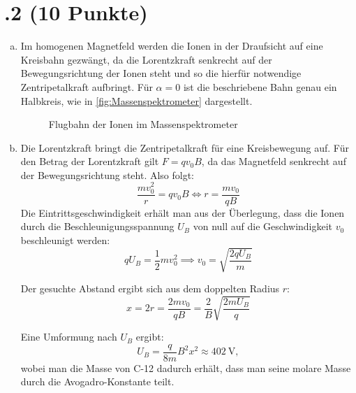 \section*{\nr.2 \tittwo (10 Punkte)}
\begin{enumerate}[(a)]
\item 
Im homogenen Magnetfeld werden die Ionen in der Draufsicht auf eine Kreisbahn gezwängt, da die Lorentzkraft senkrecht auf der Bewegungsrichtung der Ionen steht und so die hierfür notwendige Zentripetalkraft aufbringt. Für $\alpha=0$ ist die beschriebene Bahn genau ein Halbkreis, wie in \vref{fig:Massenspektrometer} dargestellt.
\begin{figure}[htbp]
\centering
{}
\caption{Flugbahn der Ionen im Massenspektrometer}
\label{fig:Massenspektrometer}
\end{figure}

\item Die Lorentzkraft bringt die Zentripetalkraft für eine Kreisbewegung auf. Für den Betrag der Lorentzkraft gilt $F=qv_0B$, da das Magnetfeld senkrecht auf der Bewegungsrichtung steht. Also folgt:
\begin{equation}
\frac{mv_0^2}{r} = q v_0 B \iff r = \frac{mv_0}{qB}
\end{equation}
Die Eintrittsgeschwindigkeit erhält man aus der Überlegung, dass die Ionen durch die Beschleunigungsspannung $U_B$ von null auf die Geschwindigkeit $v_0$ beschleunigt werden:
\begin{equation}
qU_B = \frac{1}{2} m v_0^2 \implies v_0 = \sqrt{\frac{2qU_B}{m}}
\end{equation}

Der gesuchte Abstand ergibt sich aus dem doppelten Radius $r$:
\begin{equation}
x=2r = \frac{2mv_0}{qB} = \frac{2}{B} \sqrt{\frac{2mU_B}{q}}
\end{equation}

Eine Umformung nach $U_B$ ergibt:
\begin{equation}
U_B = \frac{q}{8m} B^2 x^2 \approx \SI{402}{\volt},
\end{equation}
wobei man die Masse von C-12 dadurch erhält, dass man seine molare Masse durch die Avogadro-Konstante teilt.


\end{enumerate}
